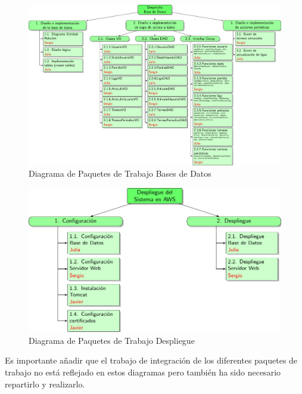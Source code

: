 \begin{figure}[H]
		\hspace{-2cm}
		\includegraphics[scale=0.8]{figuras/edtBasesDatos.pdf}
		\caption{Diagrama de Paquetes de Trabajo Bases de Datos}
	\end{figure}

\begin{figure}[H]
		\centering
		\includegraphics[scale=0.8]{figuras/edtDespliegue.pdf}
		\caption{Diagrama de Paquetes de Trabajo Despliegue}
	\end{figure}

Es importante añadir que el trabajo de integración de los diferentes paquetes de trabajo no está reflejado en estos diagramas pero también ha sido necesario repartirlo y realizarlo.

